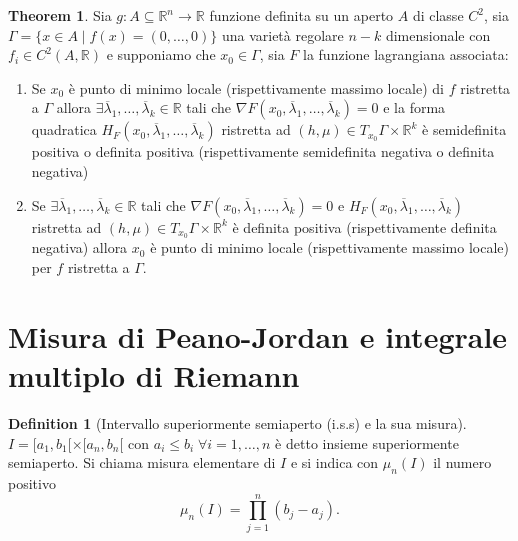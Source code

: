 \documentclass[leqno]{article}
\theoremstyle{definition}
\newtheorem{definition}{Definition}[section]
\numberwithin{equation}{section}
\newtheorem{theorem}{Theorem}[section]
\theoremstyle{remark}
\begin{document}
	\begin{theorem}
		Sia $g:A\subseteq \mathbb{R}^n \rightarrow \mathbb{R}$ funzione definita su un aperto $A$ di classe $C^2$, sia $\Gamma =\{ x \in A \; | \; f(x)=(0,\dots,0)\}$ una varietà regolare $n-k$ dimensionale con $f_i\in C^2(A,\mathbb{R})$ e supponiamo che $x_0\in \Gamma$, sia $F$ la funzione lagrangiana associata:
		\begin{enumerate}
			\item Se $x_0$ è punto di minimo locale (rispettivamente massimo locale) di $f$ ristretta a $\Gamma$ allora $\exists \overline{\lambda}_1,\dots,\overline{\lambda}_k \in \mathbb{R}$ tali che $\nabla F(x_0,\overline{\lambda}_1,\dots,\overline{\lambda}_k)=0$ e la forma quadratica $H_F(x_0,\overline{\lambda}_1,\dots,\overline{\lambda}_k)$ ristretta ad $(h,\mu)\in T_{x_0}\Gamma \times \mathbb{R}^k$ è semidefinita positiva o definita positiva (rispettivamente semidefinita negativa o definita negativa)
			\item Se $\exists \overline{\lambda}_1,\dots,\overline{\lambda}_k \in \mathbb{R}$ tali che $\nabla F (x_0,\overline{\lambda}_1,\dots,\overline{\lambda}_k)=0$ e $H_F(x_0,\overline{\lambda}_1,\dots,\overline{\lambda}_k)$ ristretta ad $(h,\mu)\in T_{x_0}\Gamma \times \mathbb{R}^k$ è definita positiva (rispettivamente definita negativa) allora $x_0$ è punto di minimo locale (rispettivamente massimo locale) per $f$ ristretta a $\Gamma$.
		\end{enumerate}
	\end{theorem}
	\section{Misura di Peano-Jordan e integrale multiplo di Riemann}
	\begin{definition}[Intervallo superiormente semiaperto (i.s.s) e la sua misura] 
		$I=[a_1,b_1[\times[a_n,b_n[$ con $a_i\le b_i \; \forall i=1,\dots,n$ è detto insieme superiormente semiaperto. Si chiama misura elementare di $I$ e si indica con $\mu_n(I)$ il numero positivo 
		\[\mu_n(I)=\prod_{j=1}^n(b_j-a_j).\]
		
	\end{definition}
	
\end{document}
